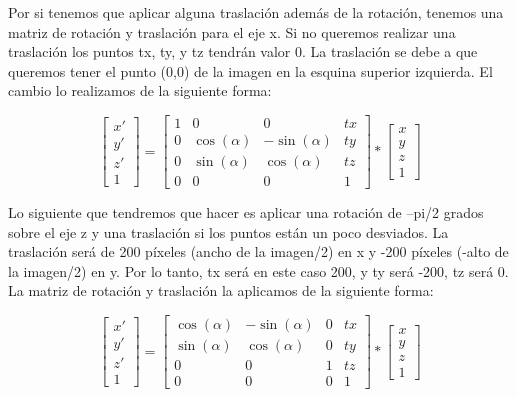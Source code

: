 Por si tenemos que aplicar alguna traslación además de la rotación, tenemos una matriz de rotación y traslación para el eje x. Si no queremos realizar una traslación los puntos tx, ty, y tz tendrán valor 0. La traslación se debe a que queremos tener el punto (0,0) de la imagen en la esquina superior izquierda. El cambio lo realizamos de la siguiente forma:

\begin{equation}
\left[\begin{array}{cc}
x' \\ 
y' \\
z' \\
1
\end{array}\right] = \left[\begin{array}{cccc}
1 & 0 & 0 & tx \\ 
0 & \cos(\alpha) & -\sin(\alpha) & ty\\
0 & \sin(\alpha) & \cos(\alpha) & tz \\
0 & 0 & 0 & 1
\end{array}\right]* \left[\begin{array}{cc}
x \\ 
y \\
z \\
1
\end{array}\right]
\end{equation}
 
Lo siguiente que tendremos que hacer es aplicar una rotación de –pi/2 grados sobre el eje z y una traslación si los puntos están un poco desviados. La traslación será de 200 píxeles (ancho de la imagen/2) en x y -200 píxeles (-alto de la imagen/2) en y. Por lo tanto, tx será en este caso 200, y ty será -200, tz será 0. La matriz de rotación y traslación la aplicamos de la siguiente forma:

\begin{equation}
\left[\begin{array}{cc}
x' \\ 
y' \\
z' \\
1
\end{array}\right] = \left[\begin{array}{cccc}
\cos(\alpha) & -\sin(\alpha) & 0 & tx \\ 
\sin(\alpha) & \cos(\alpha) & 0 & ty\\
0 & 0 & 1 & tz \\
0 & 0 & 0 & 1
\end{array}\right]* \left[\begin{array}{cc}
x \\ 
y \\
z \\
1
\end{array}\right]
\end{equation}

